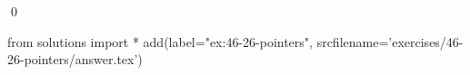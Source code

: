 
\begin{ex}
  \label{ex:46-26-pointers}
  
  \qed
\end{ex}
\begin{python0}
from solutions import *
add(label="ex:46-26-pointers",
    srcfilename='exercises/46-26-pointers/answer.tex')
\end{python0}
